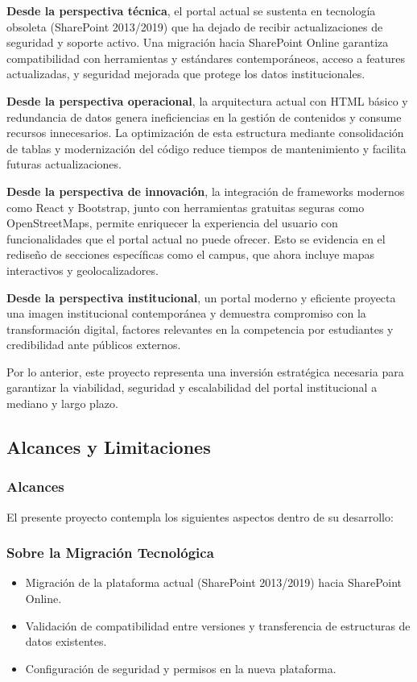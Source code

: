 \textbf{Desde la perspectiva técnica}, el portal actual se sustenta en tecnología obsoleta (SharePoint 2013/2019) que ha dejado de recibir actualizaciones de seguridad y soporte activo. Una migración hacia SharePoint Online garantiza compatibilidad con herramientas y estándares contemporáneos, acceso a features actualizadas, y seguridad mejorada que protege los datos institucionales.

\textbf{Desde la perspectiva operacional}, la arquitectura actual con HTML básico y redundancia de datos genera ineficiencias en la gestión de contenidos y consume recursos innecesarios. La optimización de esta estructura mediante consolidación de tablas y modernización del código reduce tiempos de mantenimiento y facilita futuras actualizaciones.

\textbf{Desde la perspectiva de innovación}, la integración de frameworks modernos como React y Bootstrap, junto con herramientas gratuitas seguras como OpenStreetMaps, permite enriquecer la experiencia del usuario con funcionalidades que el portal actual no puede ofrecer. Esto se evidencia en el rediseño de secciones específicas como el campus, que ahora incluye mapas interactivos y geolocalizadores.

\textbf{Desde la perspectiva institucional}, un portal moderno y eficiente proyecta una imagen institucional contemporánea y demuestra compromiso con la transformación digital, factores relevantes en la competencia por estudiantes y credibilidad ante públicos externos.

Por lo anterior, este proyecto representa una inversión estratégica necesaria para garantizar la viabilidad, seguridad y escalabilidad del portal institucional a mediano y largo plazo.

\subsection{Alcances y Limitaciones}
\label{sec:alcances_limitaciones}

\subsubsection{Alcances}
\label{subsec:alcances}

El presente proyecto contempla los siguientes aspectos dentro de su desarrollo:

\subsubsection*{Sobre la Migración Tecnológica}
\begin{itemize}
    \item Migración de la plataforma actual (SharePoint 2013/2019) hacia SharePoint Online.
    \item Validación de compatibilidad entre versiones y transferencia de estructuras de datos existentes.
    \item Configuración de seguridad y permisos en la nueva plataforma.
\end{itemize}


